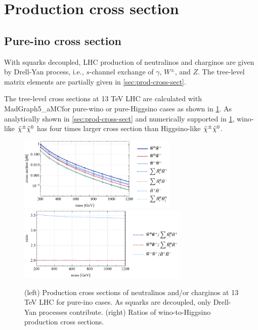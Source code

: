 \documentclass[a4paper,10pt,captions=tableheading,DIV=14]{scrartcl}
\numberwithin{equation}{section}
\newcommand\neut  [1][\relax]{{\tilde\chi^0_{#1}}}
\newcommand\charPM[1][\relax]{{\tilde\chi^\pm_{#1}}}
\begin{document}
\clearpage



\section{Production cross section}
\subsection{Pure-ino cross section}
With squarks decoupled, LHC production of neutralinos and charginos are given by Drell-Yan process, i.e., $s$-channel exchange of $\gamma$, $W^\pm$, and $Z$.
The tree-level matrix elements are partially given in \cref{sec:prod-cross-sect}.

The tree-level cross sections at 13 TeV LHC are calculated with MadGraph5\_aMC\@NLO for pure-wino or pure-Higgsino cases as shown in \cref{fig:pure-ino-xs}.
As analytically shown in \cref{sec:prod-cross-sect} and numerically supported in \cref{fig:pure-ino-xs}, wino-like $\charPM\neut$ has four times larger cross section than Higgsino-like $\charPM\neut$.

\begin{figure}[h]
 \centering
 \includegraphics[height=100pt]{../plots/plot_xs_pure_ino_xs.pdf}
 \includegraphics[height=100pt]{../plots/plot_xs_pure_ino_ratio.pdf}

 \caption{\label{fig:pure-ino-xs}(left) Production cross sections of neutralinos and/or charginos at 13 TeV LHC for pure-ino cases. As squarks are decoupled, only Drell-Yan processes contribute. (right) Ratios of wino-to-Higgsino production cross sections.}
\end{figure}
\end{document}
